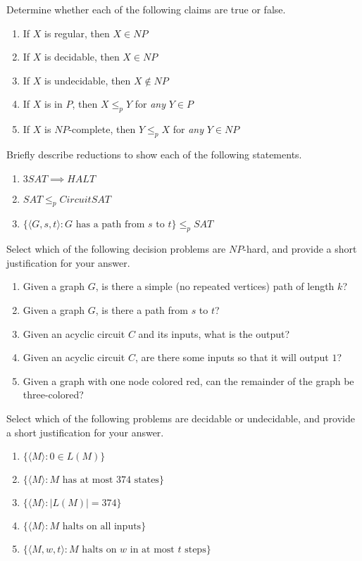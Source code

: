 \documentclass[fleqn]{article}
\begin{document}
\noindent Determine whether each of the following claims are true or false.
\begin{enumerate}
    \item If $X$ is regular, then $X \in NP$
    \item If $X$ is decidable, then $X \in NP$
    \item If $X$ is undecidable, then $X \notin NP$
    \item If $X$ is in $P$, then $X \leq_p Y$ for \textit{any} $Y \in P$
    \item If $X$ is $NP$-complete, then $Y \leq_p X$ for \textit{any} $Y \in NP$
\end{enumerate}

\noindent Briefly describe reductions to show each of the following statements.
\begin{enumerate}
    \item $3SAT \implies HALT$
    \item $SAT \leq_p CircuitSAT$
    \item $\{\langle G, s, t \rangle : \text{$G$ has a path from $s$ to $t$}\} \leq_p SAT$
\end{enumerate}

\noindent Select which of the following decision problems are $NP$-hard, and provide a short justification for your answer.
\begin{enumerate}
    \item Given a graph $G$, is there a simple (no repeated vertices) path of length $k$?
    \item Given a graph $G$, is there a path from $s$ to $t$?
    \item Given an acyclic circuit $C$ and its inputs, what is the output?
    \item Given an acyclic circuit $C$, are there some inputs so that it will output $1$?
    \item Given a graph with one node colored red, can the remainder of the graph be three-colored?
\end{enumerate}

\noindent Select which of the following problems are decidable or undecidable, and provide a short justification for your answer.
\begin{enumerate}
    \item $\{\langle M \rangle : 0 \in L(M)\}$
    \item $\{\langle M \rangle : M\text{ has at most 374 states}\}$
    \item $\{\langle M \rangle : |L(M)| = 374\}$
    \item $\{\langle M \rangle : M\text{ halts on all inputs}\}$
    \item $\{\langle M, w, t \rangle : M\text{ halts on $w$ in at most $t$ steps}\}$
\end{enumerate}
\end{document}
